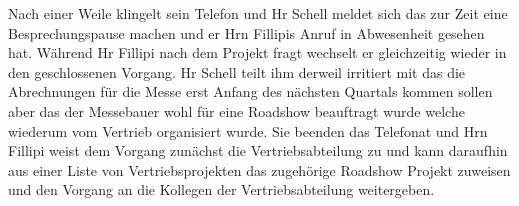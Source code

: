\documentclass[11pt,oneside,a4paper,notitlepage]{article}
\begin{document}
Nach einer Weile klingelt sein Telefon und Hr Schell meldet sich das zur Zeit eine Besprechungspause machen und er Hrn Fillipis Anruf in Abwesenheit gesehen hat. Während Hr Fillipi nach dem Projekt fragt wechselt er gleichzeitig wieder in den geschlossenen Vorgang. Hr Schell teilt ihm derweil irritiert mit das die Abrechnungen für die Messe erst Anfang des nächsten Quartals kommen sollen aber das der Messebauer wohl für eine Roadshow beauftragt wurde welche wiederum vom Vertrieb organisiert wurde. Sie beenden das Telefonat und Hrn Fillipi weist dem Vorgang zunächst die Vertriebsabteilung zu und kann daraufhin aus einer Liste von Vertriebsprojekten das zugehörige Roadshow Projekt zuweisen und den Vorgang an die Kollegen der Vertriebsabteilung weitergeben.







%
\end{document}
